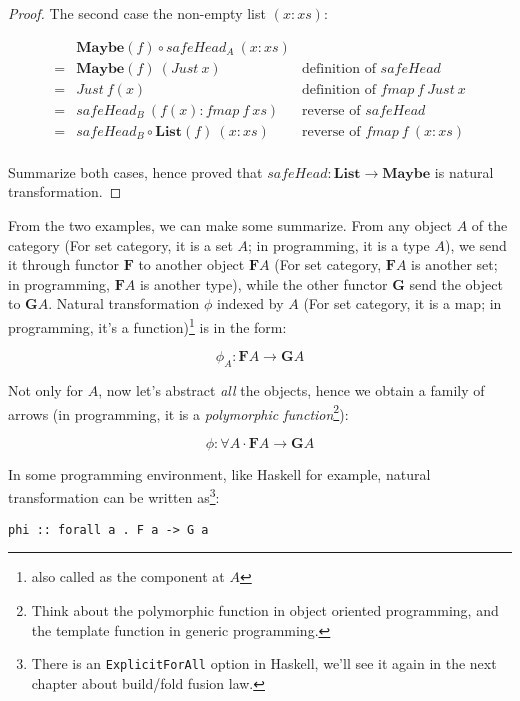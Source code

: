 \documentclass{article}
\begin{document}
\begin{example}
\begin{proof}
The second case the non-empty list $(x:xs)$:

\[
\begin{array}{cll}
  & \mathbf{Maybe}(f) \circ safeHead_A\ (x:xs) & \\
= & \mathbf{Maybe}(f)\ (Just\ x) & \text{definition of $safeHead$} \\
= & Just\ f(x) & \text{definition of $fmap\ f\ Just\ x$} \\
= & safeHead_B\ (f(x) : fmap\ f\ xs) & \text{reverse of $safeHead$} \\
= & safeHead_B \circ \mathbf{List}(f)\ (x:xs) & \text{reverse of $fmap\ f\ (x:xs)$} \\
\end{array}
\]

Summarize both cases, hence proved that $safeHead : \mathbf{List} \to \mathbf{Maybe}$ is natural transformation.
\end{proof}
\end{example}

From the two examples, we can make some summarize. From any object $A$ of the category (For set category, it is a set $A$; in programming, it is a type $A$), we send it through functor $\mathbf{F}$ to another object $\mathbf{F}A$ (For set category, $\mathbf{F}A$ is another set; in programming, $\mathbf{F}A$ is another type), while the other functor $\mathbf{G}$ send the object to $\mathbf{G}A$. Natural transformation $\phi$ indexed by $A$ (For set category, it is a map; in programming, it's a function)\footnote{also called as the component at $A$} is in the form:

\[
\phi_A : \mathbf{F} A \to \mathbf{G} A
\]

Not only for $A$, now let's abstract {\em all} the objects, hence we obtain a family of arrows (in programming, it is a {\em polymorphic function}\footnote{Think about the polymorphic function in object oriented programming, and the template function in generic programming.}):

\[
\phi : \forall A \cdot \mathbf{F} A \to \mathbf{G} A
\]

In some programming environment, like Haskell for example, natural transformation can be written as\footnote{There is an \texttt{ExplicitForAll} option in Haskell, we'll see it again in the next chapter about build/fold fusion law.}:

\lstset{frame=single}
\begin{lstlisting}
phi :: forall a . F a -> G a
\end{lstlisting}
\end{document}
